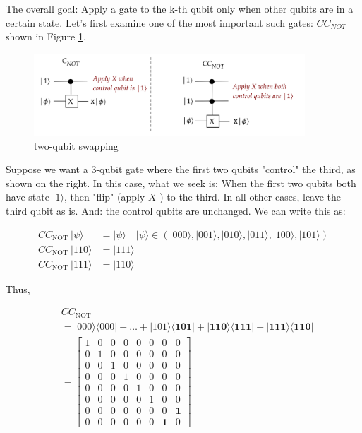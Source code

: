 \documentclass[main.tex]{subfiles}
\begin{document}
    The overall goal: Apply a gate to the k-th qubit only when other qubits are in a certain state. Let's first examine one of the most important such gates: $CC_{NOT}$ shown in Figure \ref{fig:28ccnot}.
    
    \begin{figure}
        \centering
        \includegraphics[width=4in]{notes/figs/n08/28ccnot.png}
        \caption{two-qubit swapping}
        \label{fig:28ccnot}
    \end{figure}
    
    Suppose we want a 3-qubit gate where the first two qubits "control" the third, as shown on the right. In this case, what we seek is: When the first two qubits both have state $|1\rangle$, then "flip" (apply $X$ ) to the third. In all other cases, leave the third qubit as is. And: the control qubits are unchanged. We can write this as:
    
    $$
    \begin{aligned}
    C C_{\text {NOT }}|\psi\rangle &=|\psi\rangle \quad|\psi\rangle \in(|000\rangle,|001\rangle,|010\rangle,|011\rangle,|100\rangle,|101\rangle) \\
    C C_{\text {NOT }}|110\rangle &=|111\rangle \\
    C C_{\text {NOT }}|111\rangle &=|110\rangle
    \end{aligned}
    $$
    
    Thus,
    
    $$
    \begin{aligned}
    &C C_{\text {NOT }} \\
    &=|000\rangle\langle 000|+\ldots+| 101\rangle\langle\mathbf{1 0 1}|+| \mathbf{1 1 0}\rangle\langle\mathbf{1 1 1}|+| \mathbf{1 1 1}\rangle\langle\mathbf{1 1 0}| \\
    &=\left[\begin{array}{llllllll}
    1 & 0 & 0 & 0 & 0 & 0 & 0 & 0 \\
    0 & 1 & 0 & 0 & 0 & 0 & 0 & 0 \\
    0 & 0 & 1 & 0 & 0 & 0 & 0 & 0 \\
    0 & 0 & 0 & 1 & 0 & 0 & 0 & 0 \\
    0 & 0 & 0 & 0 & 1 & 0 & 0 & 0 \\
    0 & 0 & 0 & 0 & 0 & 1 & 0 & 0 \\
    0 & 0 & 0 & 0 & 0 & 0 & 0 & \mathbf{1} \\
    0 & 0 & 0 & 0 & 0 & 0 & \mathbf{1} & 0
    \end{array}\right]
    \end{aligned}
    $$
    
\end{document}
